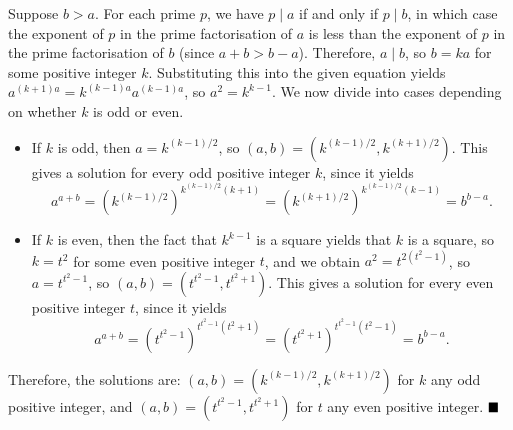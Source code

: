 \documentclass[12pt]{article}
\begin{document}
\begin{enumerate}[topsep=2\bigskipamount,itemsep=\bigskipamount]
Suppose $b > a$. For each prime $p$, we have $p \mid a$ if and only if $p \mid b$, in which case the exponent of $p$ in the prime factorisation of $a$ is less than the exponent of $p$ in the prime factorisation of $b$ (since $a+b > b-a$). Therefore, $a \mid b$, so $b = ka$ for some positive integer $k$. Substituting this into the given equation yields $a^{(k + 1)a} = k^{(k - 1)a}a^{(k - 1)a}$, so $a^{2} = k^{k-1}$. We now divide into cases depending on whether $k$ is odd or even.
\begin{itemize}
\item If $k$ is odd, then $a = k^{(k-1)/2}$, so $(a, b) = (k^{(k - 1)/2}, k^{(k + 1)/2})$. This gives a solution for every odd positive integer $k$, since it yields
$$a^{a + b} = (k^{(k - 1)/2})^{k^{(k - 1)/2}(k + 1)} = (k^{(k + 1)/2})^{k^{(k - 1)/2}(k - 1)} = b^{b - a}.$$
\item If $k$ is even, then the fact that $k^{k-1}$ is a square yields that $k$ is a square, so $k = t^{2}$ for some even positive integer $t$, and we obtain $a^{2} = t^{2(t^{2} - 1)}$, so $a = t^{t^{2} - 1}$, so $(a, b) = (t^{t^{2} - 1}, t^{t^{2} + 1})$. This gives a solution for every even positive integer $t$, since it yields
$$a^{a + b} = (t^{t^{2} - 1})^{t^{t^{2} - 1}(t^{2} + 1)} = (t^{t^{2} + 1})^{t^{t^{2} - 1}(t^{2} - 1)} = b^{b - a}.$$
\end{itemize}
Therefore, the solutions are: $(a, b) = (k^{(k - 1)/2}, k^{(k + 1)/2})$ for $k$ any odd positive integer, and $(a, b) = (t^{t^{2} - 1}, t^{t^{2} + 1})$ for $t$ any even positive integer. $\hfill\blacksquare$
\end{enumerate}
\end{document}
